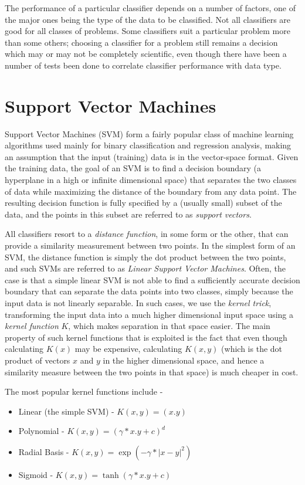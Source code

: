 The performance of a particular classifier depends on a number of factors, one of the major ones being the type of the data to be classified. Not all classifiers are good for all classes of problems. Some classifiers suit a particular problem more than some others; choosing a classifier for a problem still remains a decision which may or may not be completely scientific, even though there have been a number of tests been done to correlate classifier performance with data type.

\section{Support Vector Machines}
Support Vector Machines (SVM) form a fairly popular class of machine learning algorithms used mainly for binary classification and regression analysis, making an assumption that the input (training) data is in the vector-space format. Given the training data, the goal of an SVM is to find a decision boundary (a hyperplane in a high or infinite dimensional space) that separates the two classes of data while maximizing the distance of the boundary from any data point. The resulting decision function is fully specified by a (usually small) subset of the data, and the points in this subset are referred to as \emph{support vectors}.

All classifiers resort to a \emph{distance function}, in some form or the other, that can provide a similarity measurement between two points. In the simplest form of an SVM, the distance function is simply the dot product between the two points, and such SVMs are referred to as \emph{Linear Support Vector Machines}. Often, the case is that a simple linear SVM is not able to find a sufficiently accurate decision boundary that can separate the data points into two classes, simply because the input data is not linearly separable. In such cases, we use the \emph{kernel trick}, transforming the input data into a much higher dimensional input space using a \emph{kernel function} $K$, which makes separation in that space easier. The main property of such kernel functions that is exploited is the fact that even though calculating $K(x)$ may be expensive, calculating $K(x, y)$ (which is the dot product of vectors $x$ and $y$ in the higher dimensional space, and hence a similarity measure between the two points in that space) is much cheaper in cost.

The most popular kernel functions include -
\begin{itemize}
    \item{Linear (the simple SVM) - $K(x, y) = (x . y)$ }
    \item{Polynomial - $K(x, y) = (\gamma * x . y + c)^{d}$}
    \item{Radial Basis - $K(x, y) = \exp(-\gamma * {| x - y |}^{2})$}
    \item{Sigmoid - $K(x, y) = \tanh(\gamma * x . y + c)$}
\end{itemize}

